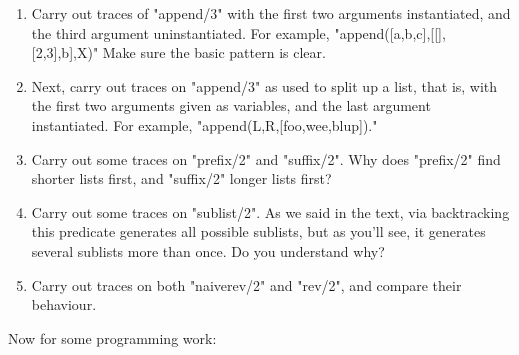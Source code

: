 \begin{enumerate}

\item{}Carry out traces of "append/3" with the
first two arguments instantiated, and the third argument
uninstantiated. For example, "append([a,b,c],[[],[2,3],b],X)"
Make sure the basic pattern is clear.

\item{}Next, carry out traces on "append/3" as used to split up a
list, that is, with the first two arguments given as variables, and the
last argument instantiated. For example,
"append(L,R,[foo,wee,blup])."

\item{}Carry out some traces on "prefix/2" and "suffix/2". Why
does "prefix/2" find shorter lists first, and
"suffix/2" longer lists first?

\item{}Carry out some traces on "sublist/2". As we said in the text,
via backtracking this predicate generates all possible sublists, but
as you'll see, it generates several sublists more than once. Do you
understand why?

\item{}Carry out traces on both "naiverev/2" and "rev/2", and
compare their behaviour.
\end{enumerate}


Now for some programming work:

